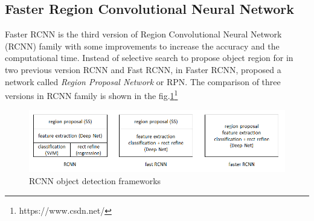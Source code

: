 \subsection{Faster Region Convolutional Neural Network}
\hspace{0.45cm}Faster \acrshort{RCNN} is the third version of Region Convolutional Neural Network (\acrshort{RCNN}) family with some
improvements to increase the accuracy and the computational time. Instead of selective search to propose object region
for in two previous version \acrshort{RCNN} and Fast \acrshort{RCNN}, in Faster \acrshort{RCNN}, \cite{FrRCNN} proposed a network called \textit{Region Proposal Network} or \acrshort{RPN}. The comparison of three versions in RCNN
family is shown in the fig.\ref{fig:rcnn_family}\footnote{https://www.csdn.net/}
\begin{figure}[h!]
    \centering
    \includegraphics[width=\textwidth]{Chapters/Fig/rcnn-family.png}
    \caption{\acrshort{RCNN} object detection frameworks}
    \label{fig:rcnn_family}
\end{figure}

